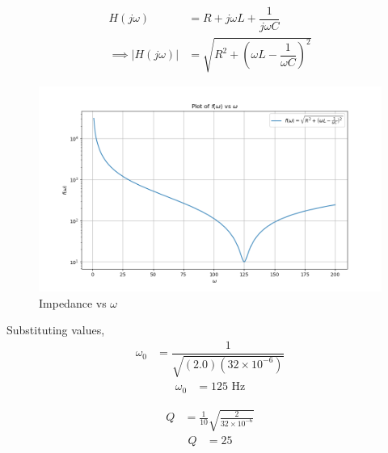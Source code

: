 \documentclass[journal,12pt,twocolumn]{IEEEtran}
\theoremstyle{remark}
\begin{document}
\begin{enumerate}
\begin{align}
      H(j\omega) &= R + j\omega L + \dfrac{1}{j\omega C}\\
     \implies \lvert H(j\omega) \rvert &= \sqrt{R^2 + \left(\omega L - \dfrac{1}{\omega C}\right)^2}
\end{align}
\begin{figure}[!h]
    \centering
    \includegraphics[width = \columnwidth]{ncert-physics/12/7/6/figs/q_plot.png}
    \caption{Impedance vs $\omega$ }
\end{figure}
\end{enumerate}

Substituting values,
\begin{align}
\omega_0 &= \dfrac{1}{\sqrt{(2.0)(32 \times 10^{-6})}}
\end{align}
\begin{align}
\omega_0 &= 125 \text{ Hz}
\end{align}


\begin{align}
Q &= \frac{1}{10}\sqrt{\frac{2}{32 \times 10^{-6}}}
\end{align}
\begin{align}
Q &= 25
\end{align}


\end{document}
